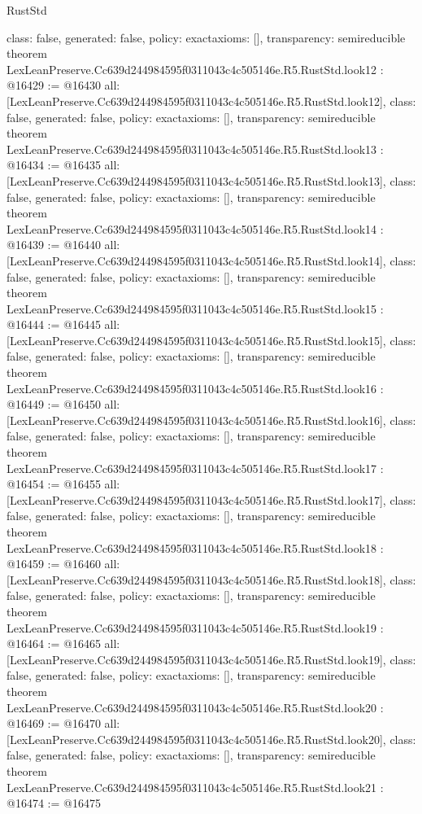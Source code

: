 \begin{lexlean}{RustStd}
\begin{coremodule}
{  class: false,
  generated: false,
  policy: exact{axioms: []},
  transparency: semireducible
}
theorem LexLeanPreserve.Cc639d244984595f0311043c4c505146e.R5.RustStd.look12 : @16429 := @16430 {
  all: [LexLeanPreserve.Cc639d244984595f0311043c4c505146e.R5.RustStd.look12],
  class: false,
  generated: false,
  policy: exact{axioms: []},
  transparency: semireducible
}
theorem LexLeanPreserve.Cc639d244984595f0311043c4c505146e.R5.RustStd.look13 : @16434 := @16435 {
  all: [LexLeanPreserve.Cc639d244984595f0311043c4c505146e.R5.RustStd.look13],
  class: false,
  generated: false,
  policy: exact{axioms: []},
  transparency: semireducible
}
theorem LexLeanPreserve.Cc639d244984595f0311043c4c505146e.R5.RustStd.look14 : @16439 := @16440 {
  all: [LexLeanPreserve.Cc639d244984595f0311043c4c505146e.R5.RustStd.look14],
  class: false,
  generated: false,
  policy: exact{axioms: []},
  transparency: semireducible
}
theorem LexLeanPreserve.Cc639d244984595f0311043c4c505146e.R5.RustStd.look15 : @16444 := @16445 {
  all: [LexLeanPreserve.Cc639d244984595f0311043c4c505146e.R5.RustStd.look15],
  class: false,
  generated: false,
  policy: exact{axioms: []},
  transparency: semireducible
}
theorem LexLeanPreserve.Cc639d244984595f0311043c4c505146e.R5.RustStd.look16 : @16449 := @16450 {
  all: [LexLeanPreserve.Cc639d244984595f0311043c4c505146e.R5.RustStd.look16],
  class: false,
  generated: false,
  policy: exact{axioms: []},
  transparency: semireducible
}
theorem LexLeanPreserve.Cc639d244984595f0311043c4c505146e.R5.RustStd.look17 : @16454 := @16455 {
  all: [LexLeanPreserve.Cc639d244984595f0311043c4c505146e.R5.RustStd.look17],
  class: false,
  generated: false,
  policy: exact{axioms: []},
  transparency: semireducible
}
theorem LexLeanPreserve.Cc639d244984595f0311043c4c505146e.R5.RustStd.look18 : @16459 := @16460 {
  all: [LexLeanPreserve.Cc639d244984595f0311043c4c505146e.R5.RustStd.look18],
  class: false,
  generated: false,
  policy: exact{axioms: []},
  transparency: semireducible
}
theorem LexLeanPreserve.Cc639d244984595f0311043c4c505146e.R5.RustStd.look19 : @16464 := @16465 {
  all: [LexLeanPreserve.Cc639d244984595f0311043c4c505146e.R5.RustStd.look19],
  class: false,
  generated: false,
  policy: exact{axioms: []},
  transparency: semireducible
}
theorem LexLeanPreserve.Cc639d244984595f0311043c4c505146e.R5.RustStd.look20 : @16469 := @16470 {
  all: [LexLeanPreserve.Cc639d244984595f0311043c4c505146e.R5.RustStd.look20],
  class: false,
  generated: false,
  policy: exact{axioms: []},
  transparency: semireducible
}
theorem LexLeanPreserve.Cc639d244984595f0311043c4c505146e.R5.RustStd.look21 : @16474 := @16475 {
}
\end{coremodule}
\end{lexlean}
